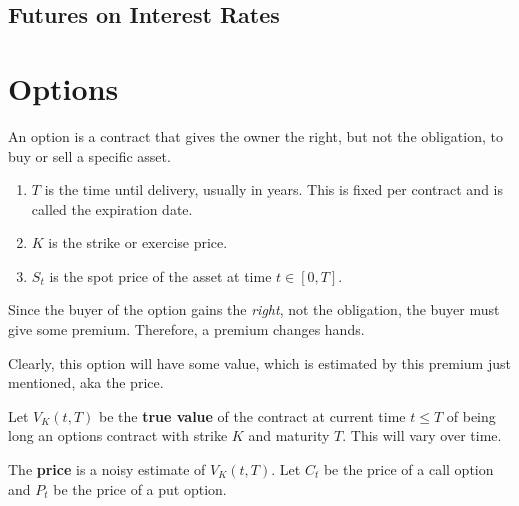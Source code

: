 \documentclass{article}
\begin{document}
  \subsection{Futures on Interest Rates}

\section{Options}

    \begin{definition}[Options]
      An option is a contract that gives the owner the right, but not the obligation, to buy or sell a specific asset. 
      \begin{enumerate}
        \item $T$ is the time until delivery, usually in years. This is fixed per contract and is called the expiration date. 
        \item $K$ is the strike or exercise price. 
        \item $S_t$ is the spot price of the asset at time $t \in [0, T]$. 
      \end{enumerate}
      Since the buyer of the option gains the \textit{right}, not the obligation, the buyer must give some premium. Therefore, a premium changes hands. 
    \end{definition}

    Clearly, this option will have some value, which is estimated by this premium just mentioned, aka the price. 

    \begin{definition}[Value]
      Let $V_K (t, T)$ be the \textbf{true value} of the contract at current time $t \leq T$ of being long an options contract with strike $K$ and maturity $T$. This will vary over time. 

      The \textbf{price} is a noisy estimate of $V_K (t, T)$. Let $C_t$ be the price of a call option and $P_t$ be the price of a put option.
    \end{definition}
\end{document}
